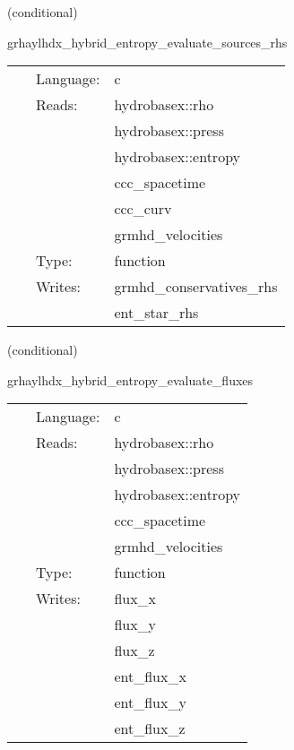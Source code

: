 \vspace{5mm}

   (conditional) 

\hspace{5mm} grhaylhdx\_hybrid\_entropy\_evaluate\_sources\_rhs 

\hspace{5mm}{\it entropy+hybrid version of grhaylhdx\_evaluate\_sources\_rhs } 


\hspace{5mm}

 \begin{tabular*}{160mm}{cll} 
~ & Language:  & c \\ 
~ & Reads:  & hydrobasex::rho \\ 
~& ~ &hydrobasex::press\\ 
~& ~ &hydrobasex::entropy\\ 
~& ~ &ccc\_spacetime\\ 
~& ~ &ccc\_curv\\ 
~& ~ &grmhd\_velocities\\ 
~ & Type:  & function \\ 
~ & Writes:  & grmhd\_conservatives\_rhs \\ 
~& ~ &ent\_star\_rhs\\ 
\end{tabular*} 


\vspace{5mm}

   (conditional) 

\hspace{5mm} grhaylhdx\_hybrid\_entropy\_evaluate\_fluxes 

\hspace{5mm}{\it entropy+hybrid version of grhaylhdx\_evaluate\_fluxes } 


\hspace{5mm}

 \begin{tabular*}{160mm}{cll} 
~ & Language:  & c \\ 
~ & Reads:  & hydrobasex::rho \\ 
~& ~ &hydrobasex::press\\ 
~& ~ &hydrobasex::entropy\\ 
~& ~ &ccc\_spacetime\\ 
~& ~ &grmhd\_velocities\\ 
~ & Type:  & function \\ 
~ & Writes:  & flux\_x \\ 
~& ~ &flux\_y\\ 
~& ~ &flux\_z\\ 
~& ~ &ent\_flux\_x\\ 
~& ~ &ent\_flux\_y\\ 
~& ~ &ent\_flux\_z\\ 
\end{tabular*} 


